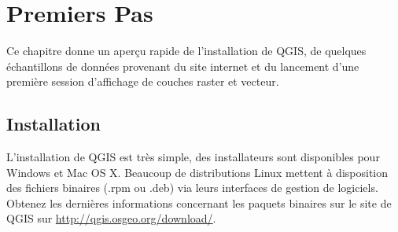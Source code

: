 %

\section{Premiers Pas}\label{label_getstarted}

Ce chapitre donne un aper\c{c}u rapide de l'installation de QGIS, de quelques \'echantillons de donn\'ees provenant du site internet et du lancement d'une premi\`ere session d'affichage de couches raster et vecteur.

%
%

\subsection{Installation}\label{label_installation} 

L'installation de QGIS est tr\`es simple, des installateurs sont disponibles pour Windows et Mac OS X. Beaucoup de distributions Linux mettent \`a disposition des fichiers binaires (.rpm ou .deb) via leurs interfaces de gestion de logiciels. Obtenez les derni\`eres informations concernant les paquets binaires sur le site de QGIS sur \url{http://qgis.osgeo.org/download/}.

